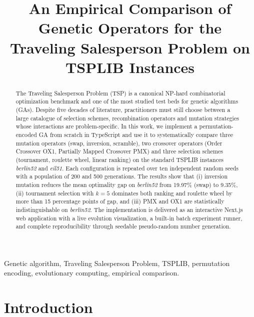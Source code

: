 \documentclass[conference]{IEEEtran}
\begin{document}
\title{An Empirical Comparison of Genetic Operators for the Traveling Salesperson Problem on TSPLIB Instances}

\author{
}

\maketitle

\begin{abstract}
The Traveling Salesperson Problem (TSP) is a canonical NP-hard combinatorial
optimization benchmark and one of the most studied test beds for genetic
algorithms (GAs). Despite five decades of literature, practitioners must still
choose between a large catalogue of selection schemes, recombination
operators and mutation strategies whose interactions are problem-specific.
In this work, we implement a permutation-encoded GA from scratch in
TypeScript and use it to systematically compare three mutation operators
(swap, inversion, scramble), two crossover operators (Order Crossover OX1,
Partially Mapped Crossover PMX) and three selection schemes (tournament,
roulette wheel, linear ranking) on the standard TSPLIB instances
\textit{berlin52} and \textit{eil51}. Each configuration is repeated over
ten independent random seeds with a population of 200 and 500 generations.
The results show that (i) inversion mutation reduces the mean optimality gap
on \textit{berlin52} from 19.97\% (swap) to 9.35\%, (ii) tournament
selection with $k=5$ dominates both ranking and roulette wheel by more than
15 percentage points of gap, and (iii) PMX and OX1 are statistically
indistinguishable on \textit{berlin52}. The implementation is delivered as
an interactive Next.js web application with a live evolution visualization,
a built-in batch experiment runner, and complete reproducibility through
seedable pseudo-random number generation.
\end{abstract}

\begin{IEEEkeywords}
Genetic algorithm, Traveling Salesperson Problem, TSPLIB, permutation
encoding, evolutionary computing, empirical comparison.
\end{IEEEkeywords}

\section{Introduction}
\end{document}
